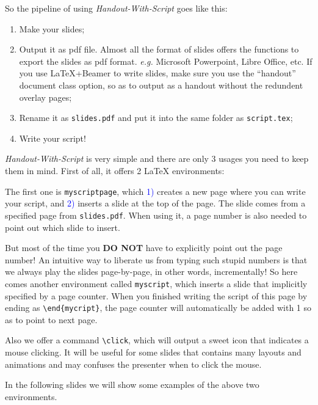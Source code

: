 \documentclass[10pt]{scrartcl}
\begin{document}
\begin{myscript}
  So the pipeline of using \textsl{Handout-With-Script} goes like this: 

  \begin{enumerate}
  \item Make your slides; \click
  \item Output it as pdf file. Almost all the format of slides offers the
    functions to export the slides as pdf format. \textsl{e.g.} Microsoft
    Powerpoint, Libre Office, etc. If you use \LaTeX{}+Beamer to write slides,
    make sure you use the ``handout'' document class option, so as to output as
    a handout without the redundent overlay pages; \click
  \item Rename it as \verb|slides.pdf| and put it into the same folder as
    \verb|script.tex|; \click
  \item Write your script! 
  \end{enumerate}
\end{myscript}

\begin{myscript}
  \textsl{Handout-With-Script} is very simple and there are only 3 usages you
  need to keep them in mind. First of all, it offers 2 \LaTeX{} environments: 

  The first one is \verb|myscriptpage|, which \textcolor{blue}{1)} creates a new
  page where you can write your script, and \textcolor{blue}{2)} inserts a slide at the top of the
  page. The slide comes from a specified page from \verb|slides.pdf|.  When
  using it, a page number is also needed to point out which slide to insert.
  \click

  But most of the time you \textbf{DO NOT} have to explicitly point out the page
  number! An intuitive way to liberate us from typing such stupid numbers is
  that we always play the slides page-by-page, in other words, incrementally! So
  here comes another environment called \verb|myscript|, which inserts a slide
  that implicitly specified by a page counter. When you finished writing the
  script of this page by ending as \verb|\end{mycript}|, the page counter will
automatically be added with 1 so as to point to next page.

Also we offer a command \verb|\click|, which will output a sweet \click icon
that indicates a mouse clicking. It will be useful for some slides that contains
many layouts and animations and may confuses the presenter when to click the
mouse.

  In the following slides we will show some examples of the above two environments.
\end{myscript}
\end{document}
